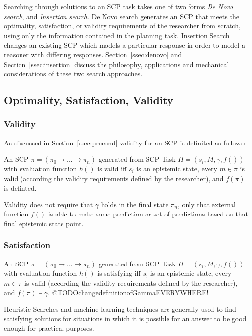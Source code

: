 \documentclass[
11pt, %
english, %
singlespacing, %
headsepline, %
]{MastersDoctoralThesis} %
\begin{document}
Searching through solutions to an SCP task takes one of two forms \textit{De Novo search}, and \textit{Insertion search}. De Novo search generates an SCP that meets the optimality, satisfaction, or validity requirements of the researcher from scratch, using only the information contained in the planning task. Insertion Search changes an existing SCP which models a particular response in order to model a reasoner with differing responses. Section~\ref{ssec:denovo} and Section~\ref{ssec:insertion} discuss the philosophy, applications and mechanical considerations of these two search approaches.



\subsection{Optimality, Satisfaction, Validity}
\subsubsection{Validity}
As discussed in Section~\ref{ssec:precond} validity for an SCP is definited as follows:

An SCP $\pi=(\pi_0 \longmapsto ... \longmapsto \pi_n)$ generated from SCP Task $\Pi=(s_i, M, \gamma, f())$ with evaluation function $h()$ is valid iff $s_i$ is an epistemic state, every $m \in \pi$ is valid (according the validity requirements defined by the researcher), and $f(\pi)$ is definted. 

Validity does not require that $\gamma$ holds in the final state $\pi_n$, only that external function $f()$ is able to make some prediction or set of predictions based on that final epistemic state point.


\subsubsection{Satisfaction} 

An SCP $\pi=(\pi_0 \longmapsto ... \longmapsto \pi_n)$ generated from SCP Task $\Pi=(s_i, M, \gamma, f())$ with evaluation function $h()$ is satisfying iff $s_i$ is an epistemic state, every $m \in \pi$ is valid (according the validity requirements defined by the researcher), and $f(\pi)\models \gamma$. @TODOchangedefinitionofGammaEVERYWHERE!

Heuristic Searches and machine learning techniques are generally used to find satisfying solutions for situations in which it is possible for an answer to be good enough for practical purposes. 
\end{document}
